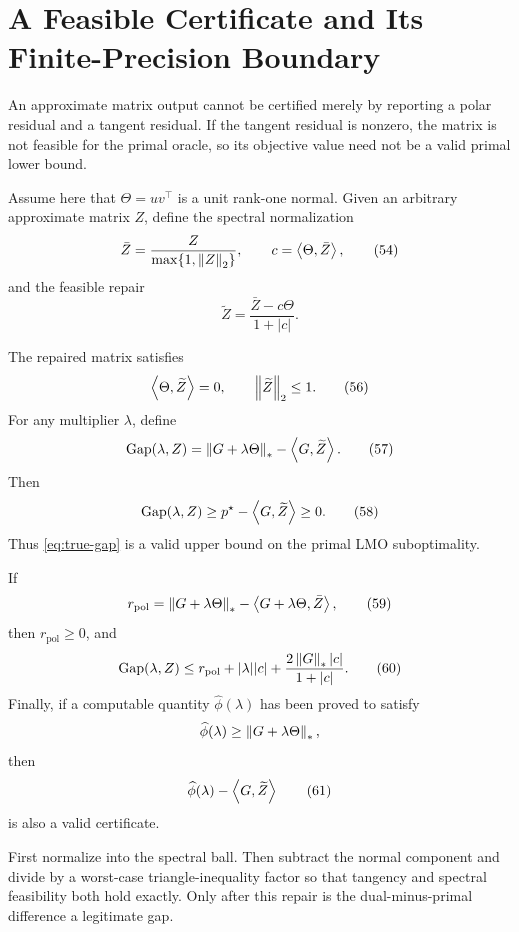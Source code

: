 \section{A Feasible Certificate and Its Finite-Precision Boundary}
\label{sec:certificates}

An approximate matrix output cannot be certified merely by reporting a polar
residual and a tangent residual.  If the tangent residual is nonzero, the
matrix is not feasible for the primal oracle, so its objective value need not
be a valid primal lower bound.

Assume here that \(\Theta=uv^\top\) is a unit rank-one normal.  Given an
arbitrary approximate matrix \(Z\), define the spectral normalization
\[
\bar Z
=
\frac{Z}{\max\{1,\left\lVert Z\right\rVert_{2}\}},
\qquad
c=\left\langle \Theta,\bar Z\right\rangle,
\tag{54}
\label{eq:Zbar-c}
\]
and the feasible repair
\[
\widetilde Z
=
\frac{\bar Z-c\Theta}{1+|c|}.
\tag{55}
\label{eq:Ztilde}
\]

\begin{theorem}
\label{thm:T6}
The repaired matrix satisfies
\[
\left\langle \Theta,\widetilde Z\right\rangle=0,
\qquad
\left\lVert \widetilde Z\right\rVert_{2}\le1.
\tag{56}
\label{eq:T6-feas}
\]
For any multiplier \(\lambda\), define
\[
\operatorname{Gap}(\lambda,Z)
=
\left\lVert G+\lambda\Theta\right\rVert_{*}
-\left\langle G,\widetilde Z\right\rangle.
\tag{57}
\label{eq:true-gap}
\]
Then
\[
\operatorname{Gap}(\lambda,Z)
\ge
p^\star-\left\langle G,\widetilde Z\right\rangle
\ge0.
\tag{58}
\label{eq:gap-cover}
\]
Thus \eqref{eq:true-gap} is a valid upper bound on the primal LMO
suboptimality.

If
\[
r_{\mathrm{pol}}
=
\left\lVert G+\lambda\Theta\right\rVert_{*}
-\left\langle G+\lambda\Theta,\bar Z\right\rangle,
\tag{59}
\label{eq:rpol}
\]
then \(r_{\mathrm{pol}}\ge0\), and
\[
\operatorname{Gap}(\lambda,Z)
\le
r_{\mathrm{pol}}
+|\lambda||c|
+\frac{2\left\lVert G\right\rVert_{*}|c|}{1+|c|}.
\tag{60}
\label{eq:gap-decomposition}
\]
Finally, if a computable quantity \(\widehat\phi(\lambda)\) has been proved to
satisfy
\[
\widehat\phi(\lambda)\ge\left\lVert G+\lambda\Theta\right\rVert_{*},
\]
then
\[
\widehat\phi(\lambda)-\left\langle G,\widetilde Z\right\rangle
\tag{61}
\label{eq:upper-certificate}
\]
is also a valid certificate.
\end{theorem}

\begin{proofidea}
First normalize into the spectral ball.  Then subtract the normal component
and divide by a worst-case triangle-inequality factor so that tangency and
spectral feasibility both hold exactly.  Only after this repair is the
dual-minus-primal difference a legitimate gap.
\end{proofidea}

